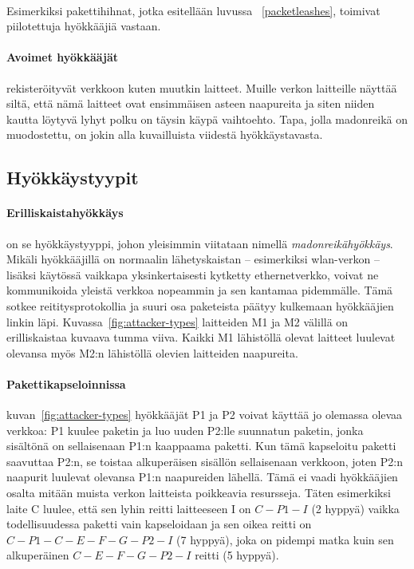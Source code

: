 \documentclass[finnish]{tktltiki2}
\theoremstyle{definition}
\theoremstyle{remark}
\begin{document}
\noindent \\
Esimerkiksi pakettihihnat, jotka esitellään luvussa ~\ref{packetleashes}, toimivat piilotettuja hyökkääjiä vastaan.

\paragraph{Avoimet hyökkääjät} rekisteröityvät verkkoon kuten muutkin laitteet. Muille verkon laitteille näyttää siltä, että nämä laitteet ovat ensimmäisen asteen naapureita ja siten niiden kautta löytyvä lyhyt polku on täysin käypä vaihtoehto. Tapa, jolla madonreikä on muodostettu, on jokin alla kuvailluista viidestä hyökkäystavasta.

\subsection{Hyökkäystyypit}

\paragraph{Erilliskaistahyökkäys} on se hyökkäystyyppi, johon yleisimmin viitataan nimellä \emph{madonreikähyökkäys}. Mikäli hyökkääjillä on normaalin lähetyskaistan -- esimerkiksi wlan-verkon -- lisäksi käytössä vaikkapa yksinkertaisesti kytketty ethernetverkko, voivat ne kommunikoida yleistä verkkoa nopeammin ja sen kantamaa pidemmälle. Tämä sotkee reititysprotokollia ja suuri osa paketeista päätyy kulkemaan hyökkääjien linkin läpi. Kuvassa~\ref{fig:attacker-types} laitteiden M1 ja M2 välillä on erilliskaistaa kuvaava tumma viiva. Kaikki M1 lähistöllä olevat laitteet luulevat olevansa myös M2:n lähistöllä olevien laitteiden naapureita.

\paragraph{Pakettikapseloinnissa} kuvan~\ref{fig:attacker-types} hyökkääjät P1 ja P2 voivat käyttää jo olemassa olevaa verkkoa: P1 kuulee paketin ja luo uuden P2:lle suunnatun paketin, jonka sisältönä on sellaisenaan P1:n kaappaama paketti. Kun tämä kapseloitu paketti saavuttaa P2:n, se toistaa alkuperäisen sisällön sellaisenaan verkkoon, joten P2:n naapurit luulevat olevansa P1:n naapureiden lähellä. Tämä ei vaadi hyökkääjien osalta mitään muista verkon laitteista poikkeavia resursseja. Täten esimerkiksi laite C luulee, että sen lyhin reitti laitteeseen I on $C-P1-I$ (2 hyppyä) vaikka todellisuudessa paketti vain kapseloidaan ja sen oikea reitti on $C-P1-C-E-F-G-P2-I$ (7 hyppyä), joka on pidempi matka kuin sen alkuperäinen $C-E-F-G-P2-I$ reitti (5 hyppyä).
\end{document}
